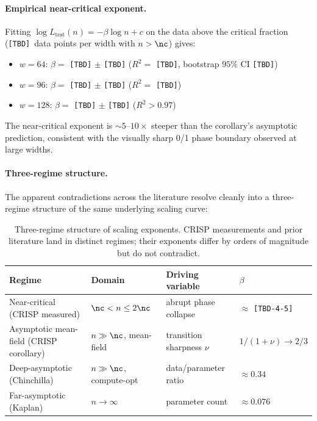\paragraph{Empirical near-critical exponent.}
Fitting $\log L_{\text{test}}(n) = -\beta \log n + c$ on the data above the critical fraction (\texttt{[TBD]}\ data points per width with $n > \nc$) gives:
\begin{itemize}
  \item $w=64$: $\beta = $ \texttt{[TBD]} $\pm$ \texttt{[TBD]} ($R^2 = $ \texttt{[TBD]}, bootstrap $95\%$ CI \texttt{[TBD]})
  \item $w=96$: $\beta = $ \texttt{[TBD]} $\pm$ \texttt{[TBD]} ($R^2 = $ \texttt{[TBD]})
  \item $w=128$: $\beta = $ \texttt{[TBD]} $\pm$ \texttt{[TBD]} ($R^2 > 0.97$)
\end{itemize}
The near-critical exponent is $\sim 5$--$10\times$ steeper than the corollary's asymptotic prediction, consistent with the visually sharp 0/1 phase boundary observed at large widths.

\paragraph{Three-regime structure.}
The apparent contradictions across the literature resolve cleanly into a three-regime structure of the same underlying scaling curve:

\begin{table}[t]
\centering
\caption{Three-regime structure of scaling exponents. CRISP measurements and prior literature land in distinct regimes; their exponents differ by orders of magnitude but do not contradict.}
\vspace{0.4em}
\begin{tabular}{@{}llll@{}}
\toprule
\textbf{Regime} & \textbf{Domain} & \textbf{Driving variable} & \textbf{$\beta$} \\
\midrule
Near-critical (CRISP measured) & $\nc < n \leq 2\nc$ & abrupt phase collapse & $\approx$ \texttt{[TBD-4-5]} \\
Asymptotic mean-field (CRISP corollary) & $n \gg \nc$, mean-field & transition sharpness $\nu$ & $1/(1+\nu) \to 2/3$ \\
Deep-asymptotic (Chinchilla) & $n \gg \nc$, compute-opt & data/parameter ratio & $\approx 0.34$ \\
Far-asymptotic (Kaplan) & $n \to \infty$ & parameter count & $\approx 0.076$ \\
\bottomrule
\end{tabular}
\label{tab:regime_sep}
\end{table}

